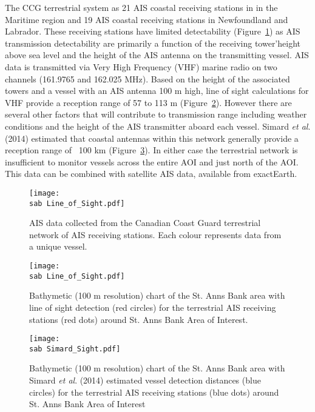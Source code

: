 \documentclass[letterpaper,portrait,11pt]{scrartcl}
\numberwithin{equation}{section}		%
\numberwithin{figure}{section}			%
\numberwithin{table}{section}				%
\newcommand{\ecomod}{\string~/ecomod_data/}   %
\newcommand{\sab}{\ecomod/mpa/sab/}   %
\begin{document}
The CCG terrestrial system as 21 AIS coastal receiving stations in in the Maritime region and 19 AIS coastal receiving stations in Newfoundland and Labrador.  These receiving stations have limited detectability (Figure~\ref{fig:TAIS}) as AIS transmission detectability are primarily a function of the receiving tower\textquoteright height above sea level and the height of the AIS antenna on the transmitting vessel.  AIS data is transmitted via Very High Frequency (VHF) marine radio on two channels (161.9765 and 162.025 MHz).  Based on the height of the associated towers and a vessel with an AIS antenna 100 m high, line of sight calculations for VHF provide a reception range of  57 to 113 m (Figure~\ref{fig:LOF}).  However there are several other factors that will contribute to transmission range including weather conditions and the height of the AIS transmitter aboard each vessel.  Simard \textit{et al}. (2014) estimated that coastal antennas within this network generally provide a reception range of ~100 km (Figure~\ref{fig:DetAIS}).  In either case the terrestrial network is insufficient to monitor vessels across the entire AOI and just north of the AOI. This data can be combined with satellite AIS data, available from exactEarth.


\begin{figure}[h]
	\label{fig:TAIS}
  \centering
	\texttt{[image: \\sab Line\_of\_Sight.pdf]}
	\caption{AIS data collected from the Canadian Coast Guard terrestrial network of AIS receiving stations.  Each colour represents data from a unique vessel.}
\end{figure}


\begin{figure}[h]
	\label{fig:LOF}
	\centering
	\texttt{[image: \\sab Line\_of\_Sight.pdf]}
	\caption{Bathymetic (100 m resolution) chart of the  St. Anns Bank area with line of sight detection (red circles) for the terrestrial AIS receiving stations (red dots) around St. Anns Bank Area of Interest.}
\end{figure}

\begin{figure}[h]
	\label{fig:DetAIS}
	\centering
	\texttt{[image: \\sab Simard\_Sight.pdf]}
	\caption{Bathymetic (100 m resolution) chart of the  St. Anns Bank area with Simard \textit{et al}. (2014) estimated vessel detection distances (blue circles) for the terrestrial AIS receiving stations (blue dots) around St. Anns Bank Area of Interest}
\end{figure}
\end{document}
